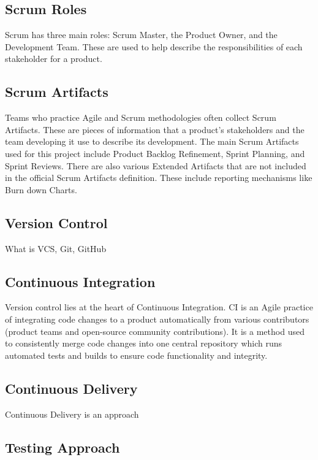 \documentclass{article}
\begin{document}
\subsection{Scrum Roles}
Scrum has three main roles: Scrum Master, the Product Owner, and the Development Team. These are used to help describe the responsibilities of each stakeholder for a product.



\subsection{Scrum Artifacts} \label{artifacts}
Teams who practice Agile and Scrum methodologies often collect Scrum Artifacts. These are pieces of information that a product's stakeholders and the team developing it use to describe its development. The main Scrum Artifacts used for this project include Product Backlog Refinement, Sprint Planning, and Sprint Reviews. There are also various Extended Artifacts that are not included in the official Scrum Artifacts definition. These include reporting mechanisms like Burn down Charts.



\subsection{Version Control} \label{version-ctrl}
What is VCS, Git, GitHub 



\subsection{Continuous Integration} \label{ci}
Version control lies at the heart of Continuous Integration. CI is an Agile practice of integrating code changes to a product automatically from various contributors (product teams and open-source community contributions). It is a method used to consistently merge code changes into one central repository which runs automated tests and builds to ensure code functionality and integrity.   


 
\subsection{Continuous Delivery} \label{cd}
Continuous Delivery is an approach 



\subsection{Testing Approach}
\end{document}

